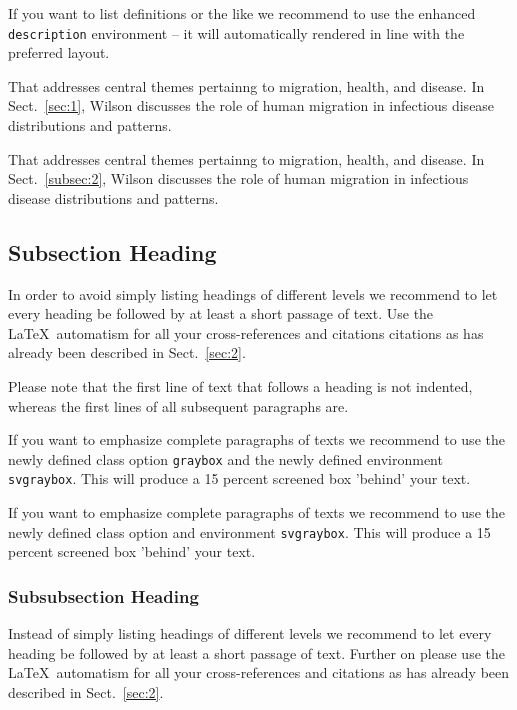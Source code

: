 \documentclass[graybox]{svmult}
\begin{document}
If you want to list definitions or the like we recommend to use the enhanced \verb|description| environment -- it will automatically rendered in line with the preferred layout.

\begin{description}[Type 1]
\item[Type 1]{That addresses central themes pertainng to migration, health, and disease. In Sect.~\ref{sec:1}, Wilson discusses the role of human migration in infectious disease distributions and patterns.}
\item[Type 2]{That addresses central themes pertainng to migration, health, and disease. In Sect.~\ref{subsec:2}, Wilson discusses the role of human migration in infectious disease distributions and patterns.}
\end{description}

\subsection{Subsection Heading} %
In order to avoid simply listing headings of different levels we recommend to let every heading be followed by at least a short passage of text. Use the \LaTeX\ automatism for all your cross-references and citations citations as has already been described in Sect.~\ref{sec:2}.

Please note that the first line of text that follows a heading is not indented, whereas the first lines of all subsequent paragraphs are.

\begin{svgraybox}
If you want to emphasize complete paragraphs of texts we recommend to use the newly defined class option \verb|graybox| and the newly defined environment \verb|svgraybox|. This will produce a 15 percent screened box 'behind' your text.

If you want to emphasize complete paragraphs of texts we recommend to use the newly defined class option and environment \verb|svgraybox|. This will produce a 15 percent screened box 'behind' your text.
\end{svgraybox}


\subsubsection{Subsubsection Heading}
Instead of simply listing headings of different levels we recommend to let every heading be followed by at least a short passage of text.  Further on please use the \LaTeX\ automatism for all your cross-references and citations as has already been described in Sect.~\ref{sec:2}.
\end{document}
